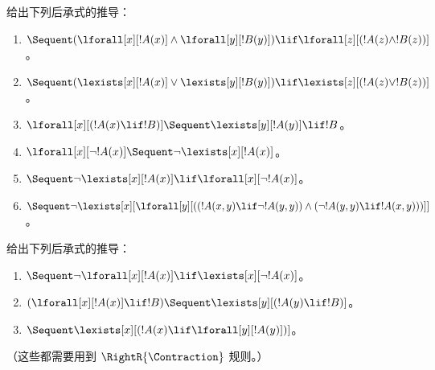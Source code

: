 \documentclass[../../../include/open-logic-section]{subfiles}
\begin{document}
\begin{prob}
给出下列后承式的推导：
\begin{enumerate}
\item $\Sequent (\lforall[x][!A(x)] \land \lforall[y][!B(y)]) \lif
\lforall[z][(!A(z) \land !B(z))]$。
\item $\Sequent (\lexists[x][!A(x)] \lor \lexists[y][!B(y)]) \lif
\lexists[z][(!A(z) \lor !B(z))]$。
\item $\lforall[x][(!A(x) \lif !B)] \Sequent \lexists[y][!A(y)] \lif !B$。
\item $\lforall[x][\lnot !A(x)] \Sequent \lnot\lexists[x][!A(x)]$。
\item $\Sequent \lnot\lexists[x][!A(x)] \lif \lforall[x][\lnot !A(x)]$。
\item $\Sequent \lnot\lexists[x][\lforall[y][((!A(x,y) \lif \lnot
!A(y,y)) \land (\lnot !A(y,y) \lif !A(x,y)))]]$。
\end{enumerate}
\end{prob}

\begin{prob}
给出下列后承式的推导：
\begin{enumerate}
\item $\Sequent \lnot\lforall[x][!A(x)] \lif \lexists[x][\lnot!A(x)]$。
\item $(\lforall[x][!A(x)] \lif !B) \Sequent \lexists[y][(!A(y) \lif !B)]$。
\item $\Sequent \lexists[x][(!A(x) \lif \lforall[y][!A(y)])]$。
\end{enumerate}
（这些都需要用到 $\RightR{\Contraction}$ 规则。）
\end{prob}
\end{document}
